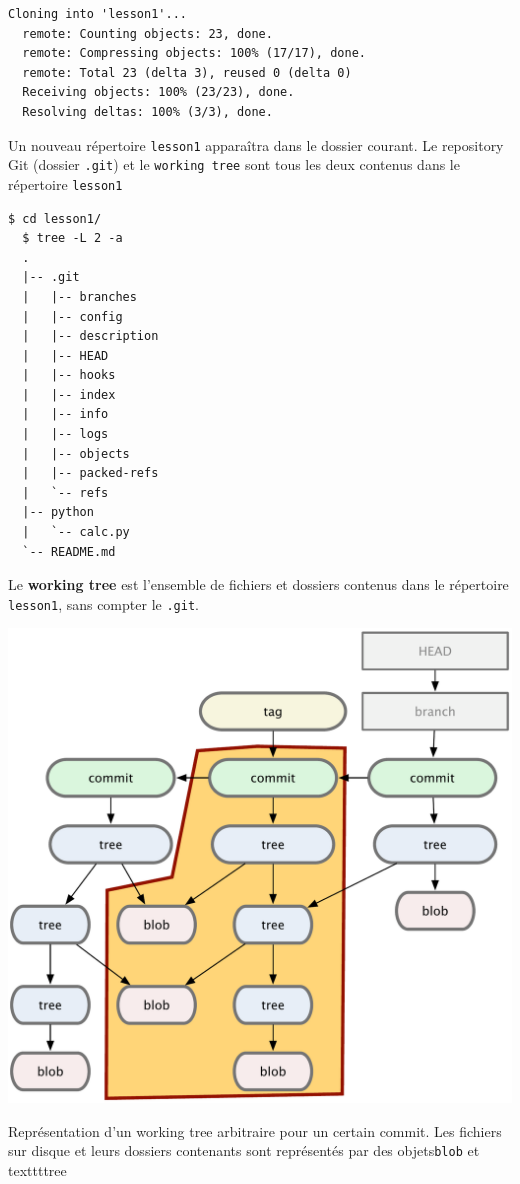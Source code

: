 \documentclass{../../common/tufte-latex/tufte-handout}
\begin{document}
\begin{lstlisting}[style=BashInputStyle]
  Cloning into 'lesson1'...
  remote: Counting objects: 23, done.
  remote: Compressing objects: 100% (17/17), done.
  remote: Total 23 (delta 3), reused 0 (delta 0)
  Receiving objects: 100% (23/23), done.
  Resolving deltas: 100% (3/3), done.
\end{lstlisting}

Un nouveau répertoire \texttt{lesson1} apparaîtra dans le dossier courant.
Le repository Git (dossier \texttt{.git}) et le \texttt{working tree} sont tous les deux contenus dans le répertoire \texttt{lesson1}

\begin{lstlisting}[style=BashInputStyle]
  $ cd lesson1/
  $ tree -L 2 -a 
  .
  |-- .git
  |   |-- branches
  |   |-- config
  |   |-- description
  |   |-- HEAD
  |   |-- hooks
  |   |-- index
  |   |-- info
  |   |-- logs
  |   |-- objects
  |   |-- packed-refs
  |   `-- refs
  |-- python
  |   `-- calc.py
  `-- README.md
\end{lstlisting}

Le \textbf{working tree} est l'ensemble de fichiers et dossiers contenus dans le répertoire \texttt{lesson1}, sans compter le \texttt{.git}.
\begin{marginfigure}%
  \centering
  \includegraphics[width=\linewidth]{tree.pdf}
  \label{fig:tree}
  \caption{Représentation d'un working tree arbitraire pour un certain commit. Les fichiers sur disque et leurs dossiers contenants sont représentés par des objets\texttt{blob} et texttt{tree}}
\end{marginfigure}
\end{document}
